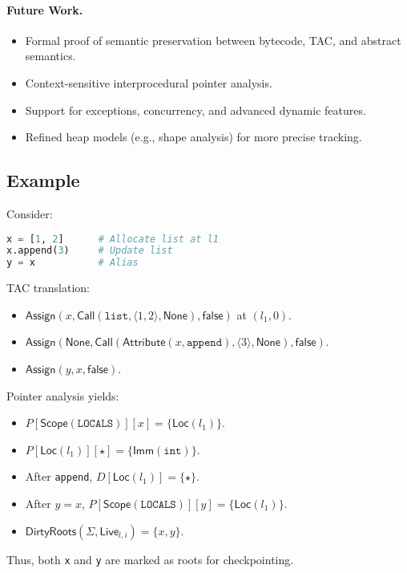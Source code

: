 \paragraph{Future Work.}
\begin{itemize}
    \item Formal proof of semantic preservation between bytecode, TAC, and abstract semantics.
    \item Context-sensitive interprocedural pointer analysis.
    \item Support for exceptions, concurrency, and advanced dynamic features.
    \item Refined heap models (e.g., shape analysis) for more precise tracking.
\end{itemize}

\subsection{Example}

Consider:
\begin{lstlisting}[language=python]
x = [1, 2]      # Allocate list at l1
x.append(3)     # Update list
y = x           # Alias
\end{lstlisting}

TAC translation:
\begin{itemize}
    \item $\mathsf{Assign}(x,\mathsf{Call}(\mathtt{list},\langle1,2\rangle,\mathsf{None}),\mathsf{false})$ at $(l_1,0)$.
    \item $\mathsf{Assign}(\mathsf{None},\mathsf{Call}(\mathsf{Attribute}(x,\mathtt{append}),\langle3\rangle,\mathsf{None}),\mathsf{false})$.
    \item $\mathsf{Assign}(y,x,\mathsf{false})$.
\end{itemize}

Pointer analysis yields:
\begin{itemize}
    \item $P[\mathsf{Scope}(\mathtt{LOCALS})][x] = \{\mathsf{Loc}(l_1)\}$.
    \item $P[\mathsf{Loc}(l_1)][\star] = \{\mathsf{Imm}(\mathtt{int})\}$.
    \item After \texttt{append}, $D[\mathsf{Loc}(l_1)] = \{\star\}$.
    \item After $y = x$, $P[\mathsf{Scope}(\mathtt{LOCALS})][y] = \{\mathsf{Loc}(l_1)\}$.
    \item $\mathsf{DirtyRoots}(\Sigma,\mathsf{Live}_{l,i}) = \{x,y\}$.
\end{itemize}
Thus, both \texttt{x} and \texttt{y} are marked as roots for checkpointing.
